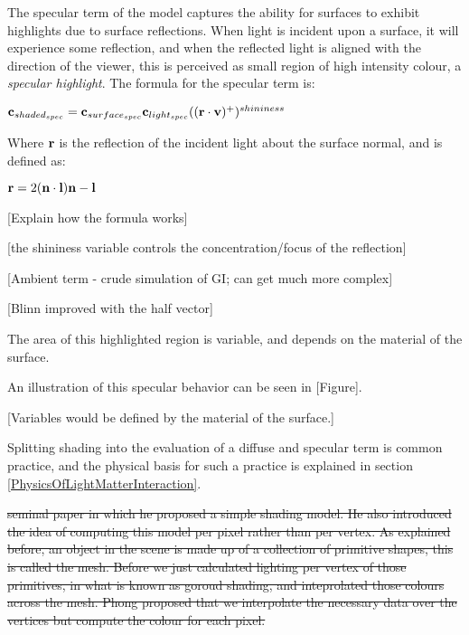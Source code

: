 The specular term of the model captures the ability for surfaces to exhibit highlights due to surface reflections. When light is incident upon a surface, it will experience some reflection, and when the reflected light is aligned with the direction of the viewer, this is perceived as small region of high intensity colour, a \textit{specular highlight}. The formula for the specular term is:

\begin{center}
	\begin{math}\mathbf{c}_{shaded_{spec}} = \mathbf{c}_{surface_{spec}}\mathbf{c}_{light_{spec}}((\mathbf{r}\cdot\mathbf{v})^+)^{shininess}\end{math} \\
\end{center}

Where \begin{math}\mathbf{r}\end{math} is the reflection of the incident light about the surface normal, and is defined as:

\begin{center}
	\begin{math}\mathbf{r} = 2(\mathbf{n}\cdot\mathbf{l})\mathbf{n} - \mathbf{l}\end{math}	
\end{center}

[Explain how the formula works]

[the shininess variable controls the concentration/focus of the reflection]

[Ambient term - crude simulation of GI; can get much more complex]

[Blinn improved with the half vector]


The area of this highlighted region is variable, and depends on the material of the surface.



An illustration of this specular behavior can be seen in [Figure].


[Variables would be defined by the material of the surface.]

Splitting shading into the evaluation of a diffuse and specular term is common practice, and the physical basis for such a practice is explained in section \ref{PhysicsOfLightMatterInteraction}.

\sout{seminal paper in which he proposed a simple shading model. He also introduced the idea of computing this model per pixel rather than per vertex. As explained before, an object in the scene is made up of a collection of primitive shapes, this is called the mesh. Before we just calculated lighting per vertex of those primitives, in what is known as goroud shading, and inteprolated those colours across the mesh. Phong proposed that we interpolate the necessary data over the vertices but compute the colour for each pixel.}

